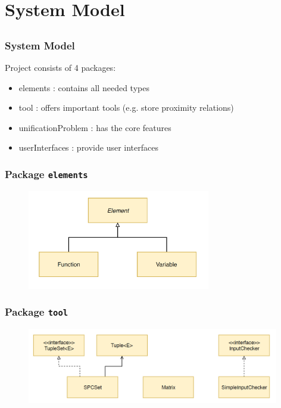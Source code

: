 \section{System Model} \subsection{}
	
	\begin{frame}[fragile=singleslide]
	\frametitle{System Model}
	 
	Project consists of 4 packages:
		\begin{itemize}
			\item elements : contains all needed types
			\item tool : offers important tools (e.g. store proximity relations)
			\item unificationProblem : has the core features
			\item userInterfaces : provide user interfaces
		\end{itemize}
	
  \end{frame}	
		

	\begin{frame}[fragile=singleslide]
	\frametitle{Package \texttt{elements}}
	
	\begin{figure}
		\centering
			\includegraphics[width=8cm]{Bilder/elements.PNG}
		\label{fig:elements}
	\end{figure}
	
  \end{frame}	


	\begin{frame}[fragile=singleslide]
	\frametitle{Package \texttt{tool}}
	 
	\begin{figure}
		\centering
			\includegraphics[width=11cm]{Bilder/tool.PNG}
		\label{fig:tool}
	\end{figure}
	
  \end{frame}	

